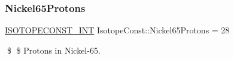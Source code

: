 \subsubsection{\texorpdfstring{Nickel65\+Protons}{Nickel65Protons}}
{\footnotesize\ttfamily \mbox{\hyperlink{group___isotope_const-_macros_ga5f18360b3e99483a35c32d789e62621c}{I\+S\+O\+T\+O\+P\+E\+C\+O\+N\+S\+T\+\_\+\+I\+NT}} Isotope\+Const\+::\+Nickel65\+Protons = 28}

\$ \$ Protons in Nickel-\/65. 